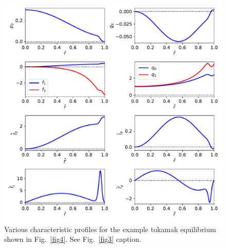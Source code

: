 \documentclass[12pt,prb,aps]{revtex4-1}
\begin{document}
\begin{figure}
\centerline{\includegraphics[width=\textwidth]{Figure6.pdf}}
\caption{Various characteristic profiles for the example tokamak equilibrium shown in Fig.~\ref{fig4}. See Fig.~\ref{fig3} caption.}\label{fig6}
\end{figure}
\end{document}
